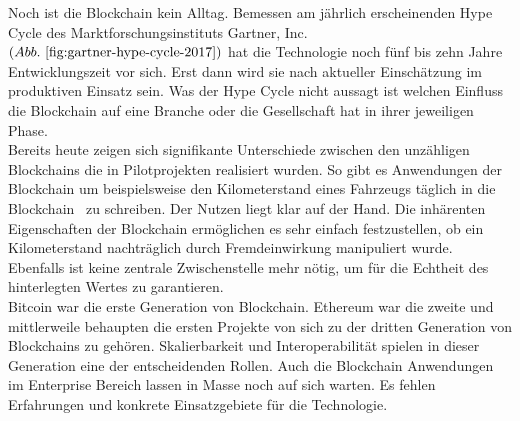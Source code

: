 Noch ist die Blockchain kein Alltag. Bemessen am jährlich erscheinenden Hype Cycle des Marktforschungsinstituts Gartner, Inc. $( Abb.~ \ref{fig:gartner-hype-cycle-2017} )$ hat die Technologie noch fünf bis zehn Jahre Entwicklungszeit vor sich. Erst dann wird sie nach aktueller Einschätzung im produktiven Einsatz sein. Was der Hype Cycle nicht aussagt ist welchen Einfluss die Blockchain auf eine Branche oder die Gesellschaft hat in ihrer jeweiligen Phase.\\

Bereits heute zeigen sich signifikante Unterschiede zwischen den unzähligen Blockchains die in Pilotprojekten realisiert wurden. So gibt es Anwendungen der Blockchain um beispielsweise den Kilometerstand eines Fahrzeugs täglich \glqq in die Blockchain\grqq~ zu schreiben. Der Nutzen liegt klar auf der Hand. Die inhärenten Eigenschaften der Blockchain ermöglichen es sehr einfach festzustellen, ob ein Kilometerstand nachträglich durch Fremdeinwirkung manipuliert wurde. Ebenfalls ist keine zentrale Zwischenstelle mehr nötig, um für die Echtheit des hinterlegten Wertes zu garantieren.\cite{carVertical}\\

Bitcoin war die erste Generation von Blockchain. Ethereum war die zweite und mittlerweile behaupten die ersten Projekte von sich zu der dritten Generation von Blockchains zu gehören. Skalierbarkeit und Interoperabilität spielen in dieser Generation eine der entscheidenden Rollen.\cite[vgl.]{Cardano} Auch die Blockchain Anwendungen im Enterprise Bereich lassen in Masse noch auf sich warten. Es fehlen Erfahrungen und konkrete Einsatzgebiete für die Technologie.

\newpage